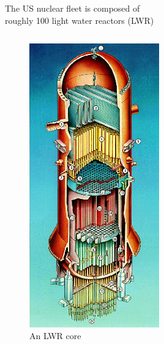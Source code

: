 \documentclass{beamer}
\begin{document}
\begin{frame}{The US nuclear fleet is composed of \\ roughly 100 light water reactors (LWR)}
\begin{columns}[T]
                \begin{column}{0.5\textwidth}
                    \begin{figure}
                        \centering
                        \includegraphics[width=0.5\textwidth]{./img/bwrCore.png}
                        \caption*{An LWR core}
                    \end{figure}
                \end{column}

            \end{columns}

        \end{frame}
\end{document}
